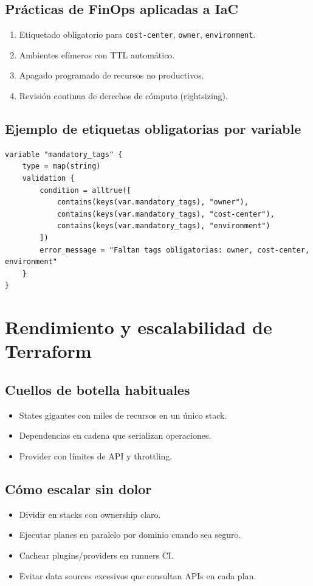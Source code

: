 \documentclass[12pt,a4paper]{article}
\begin{document}
\subsection{Prácticas de FinOps aplicadas a IaC}
\begin{enumerate}
		\item Etiquetado obligatorio para \texttt{cost-center}, \texttt{owner}, \texttt{environment}.
		\item Ambientes efímeros con TTL automático.
		\item Apagado programado de recursos no productivos.
		\item Revisión continua de derechos de cómputo (rightsizing).
\end{enumerate}

\subsection{Ejemplo de etiquetas obligatorias por variable}
\begin{lstlisting}[caption=Mapa de tags obligatorio]
variable "mandatory_tags" {
	type = map(string)
	validation {
		condition = alltrue([
			contains(keys(var.mandatory_tags), "owner"),
			contains(keys(var.mandatory_tags), "cost-center"),
			contains(keys(var.mandatory_tags), "environment")
		])
		error_message = "Faltan tags obligatorias: owner, cost-center, environment"
	}
}
\end{lstlisting}

\section{Rendimiento y escalabilidad de Terraform}

\subsection{Cuellos de botella habituales}
\begin{itemize}
		\item States gigantes con miles de recursos en un único stack.
		\item Dependencias en cadena que serializan operaciones.
		\item Provider con límites de API y throttling.
\end{itemize}

\subsection{Cómo escalar sin dolor}
\begin{itemize}
		\item Dividir en stacks con ownership claro.
		\item Ejecutar planes en paralelo por dominio cuando sea seguro.
		\item Cachear plugins/providers en runners CI.
		\item Evitar data sources excesivos que consultan APIs en cada plan.
\end{itemize}
\end{document}
